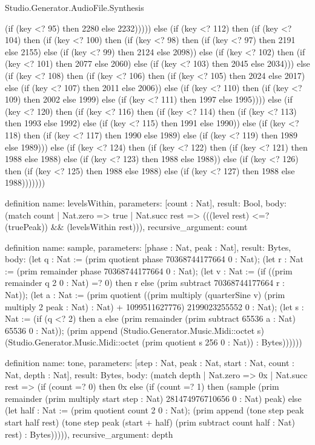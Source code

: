 \begin{lexlean}{Studio.Generator.AudioFile.Synthesis}
\begin{semanticmodule}
{(if (key <? 95) then 2280 else 2232))))) else (if (key <? 112) then (if (key <? 104) then (if (key <? 100) then (if (key <? 98) then (if (key <? 97) then 2191 else 2155) else (if (key <? 99) then 2124 else 2098)) else (if (key <? 102) then (if (key <? 101) then 2077 else 2060) else (if (key <? 103) then 2045 else 2034))) else (if (key <? 108) then (if (key <? 106) then (if (key <? 105) then 2024 else 2017) else (if (key <? 107) then 2011 else 2006)) else (if (key <? 110) then (if (key <? 109) then 2002 else 1999) else (if (key <? 111) then 1997 else 1995)))) else (if (key <? 120) then (if (key <? 116) then (if (key <? 114) then (if (key <? 113) then 1993 else 1992) else (if (key <? 115) then 1991 else 1990)) else (if (key <? 118) then (if (key <? 117) then 1990 else 1989) else (if (key <? 119) then 1989 else 1989))) else (if (key <? 124) then (if (key <? 122) then (if (key <? 121) then 1988 else 1988) else (if (key <? 123) then 1988 else 1988)) else (if (key <? 126) then (if (key <? 125) then 1988 else 1988) else (if (key <? 127) then 1988 else 1988)))))))
}

definition{
  name: levelsWithin,
  parameters: [count : Nat],
  result: Bool,
  body: (match count
    | Nat.zero => true
    | Nat.succ rest => (((level rest) <=? (truePeak)) && (levelsWithin rest))),
  recursive_argument: count
}

definition{
  name: sample,
  parameters: [phase : Nat, peak : Nat],
  result: Bytes,
  body: (let q : Nat := (prim quotient phase 70368744177664 0 : Nat); (let r : Nat := (prim remainder phase 70368744177664 0 : Nat); (let v : Nat := (if ((prim remainder q 2 0 : Nat) =? 0) then r else (prim subtract 70368744177664 r : Nat)); (let a : Nat := (prim quotient ((prim multiply (quarterSine v) (prim multiply 2 peak : Nat) : Nat) + 1099511627776) 2199023255552 0 : Nat); (let s : Nat := (if (q <? 2) then a else (prim remainder (prim subtract 65536 a : Nat) 65536 0 : Nat)); (prim append (Studio.Generator.Music.Midi::octet s) (Studio.Generator.Music.Midi::octet (prim quotient s 256 0 : Nat)) : Bytes))))))
}

definition{
  name: tone,
  parameters: [step : Nat, peak : Nat, start : Nat, count : Nat, depth : Nat],
  result: Bytes,
  body: (match depth
    | Nat.zero => 0x
    | Nat.succ rest => (if (count =? 0) then 0x else (if (count =? 1) then (sample (prim remainder (prim multiply start step : Nat) 281474976710656 0 : Nat) peak) else (let half : Nat := (prim quotient count 2 0 : Nat); (prim append (tone step peak start half rest) (tone step peak (start + half) (prim subtract count half : Nat) rest) : Bytes))))),
  recursive_argument: depth
}


\end{semanticmodule}
\end{lexlean}
